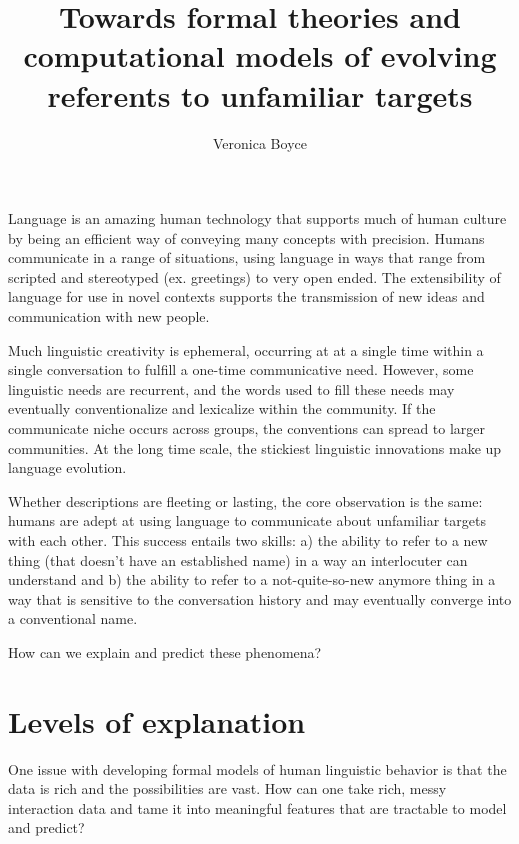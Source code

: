 \documentclass[]{article}
\title{Towards formal theories and computational models of evolving referents to unfamiliar targets}
\author{Veronica Boyce}
\begin{document}
	
	\maketitle
	
	
	
	
	Language is an amazing human technology that supports much of human culture by being an efficient way of conveying many concepts with precision. Humans communicate in a range of situations, using language in ways that range from scripted and stereotyped (ex. greetings) to very open ended. The extensibility of language for use in novel contexts supports the transmission of new ideas and communication with new people. 
	
	Much linguistic creativity is ephemeral, occurring at at a single time within a single conversation to fulfill a one-time communicative need.  However, some linguistic needs are recurrent, and the words used to fill these needs may eventually conventionalize and lexicalize within the community. If the communicate niche occurs across groups, the conventions can spread to larger communities.  At the long time scale, the stickiest linguistic innovations make up language evolution. 
	
	Whether descriptions are fleeting or lasting, the core observation is the same: humans are adept at using language to communicate about unfamiliar targets with each other. This success entails two skills: a) the ability to refer to a new thing (that doesn't have an established name) in a way an interlocuter can understand and b) the ability to refer to a not-quite-so-new anymore thing in a way that is sensitive to the conversation history and may eventually converge into a conventional name. 
	
	How can we explain and predict these phenomena?
	
	\section{Levels of explanation}
	One issue with developing formal models of human linguistic behavior is that the data is rich and the possibilities are vast. How can one take rich, messy interaction data and tame it into meaningful features that are tractable to model and predict? 
	
\end{document}
